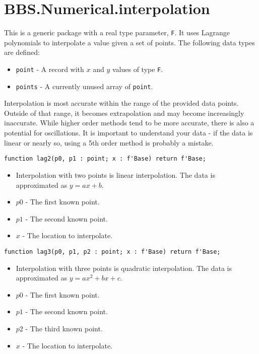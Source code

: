 \documentclass[10pt, openany]{book}
\newcommand{\datatype}[1]{\texttt{#1}}
\begin{document}
\section{BBS.Numerical.interpolation}
This is a generic package with a real type parameter, \datatype{F}.  It uses Lagrange polynomials to interpolate a value given a set of points.  The following data types are defined:
\begin{itemize}
  \item \datatype{point} - A record with $x$ and $y$ values of type \datatype{F}.
  \item \datatype{points} - A currently unused array of \datatype{point}.
\end{itemize}
Interpolation is most accurate within the range of the provided data points.  Outside of that range, it becomes extrapolation and may become increasingly inaccurate.  While higher order methods tend to be more accurate, there is also a potential for oscillations.  It is important to understand your data - if the data is linear or nearly so, using a 5th order method is probably a mistake.

\begin{lstlisting}
function lag2(p0, p1 : point; x : f'Base) return f'Base;
\end{lstlisting}
\begin{itemize}
  \item Interpolation with two points is linear interpolation.  The data is approximated as $y = ax+b$.
  \item $p0$ - The first known point.
  \item $p1$ - The second known point.
  \item $x$ - The location to interpolate.
\end{itemize}

\begin{lstlisting}
function lag3(p0, p1, p2 : point; x : f'Base) return f'Base;
\end{lstlisting}
\begin{itemize}
  \item Interpolation with three points is quadratic interpolation.  The data is approximated as $y = ax^2+bx+c$.
  \item $p0$ - The first known point.
  \item $p1$ - The second known point.
  \item $p2$ - The third known point.
  \item $x$ - The location to interpolate.
\end{itemize}
\end{document}
